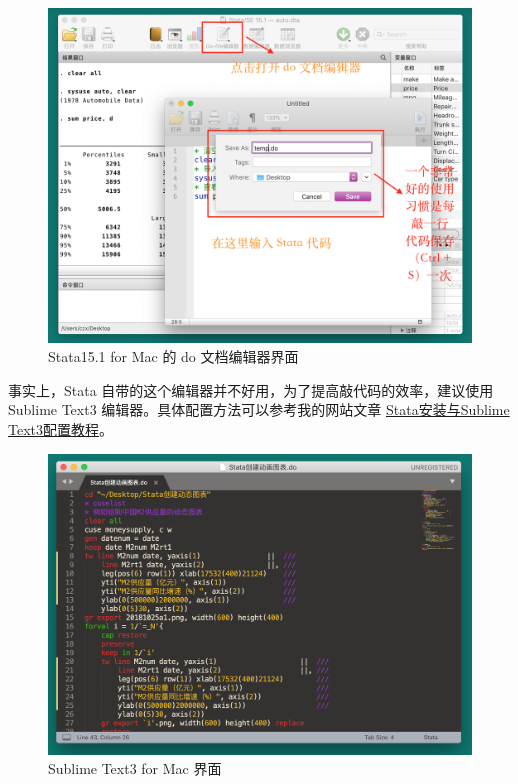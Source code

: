 \begin{figure}[htbp]
  \centering
  \includegraphics[width = \textwidth]{assets/do-file.png}
  \caption{Stata15.1 for Mac 的 do 文档编辑器界面}
  \label{fig:dofile}
\end{figure}

事实上，Stata 自带的这个编辑器并不好用，为了提高敲代码的效率，建议使用 Sublime Text3 编辑器。具体配置方法可以参考我的网站文章 \href{https://www.czxa.top/posts/59313/}{Stata安装与Sublime Text3配置教程}。

\begin{figure}[htbp]
  \centering
  \includegraphics[width = \textwidth]{assets/sublime.png}
  \caption{Sublime Text3 for Mac 界面}
  \label{fig:sublime}
\end{figure}

